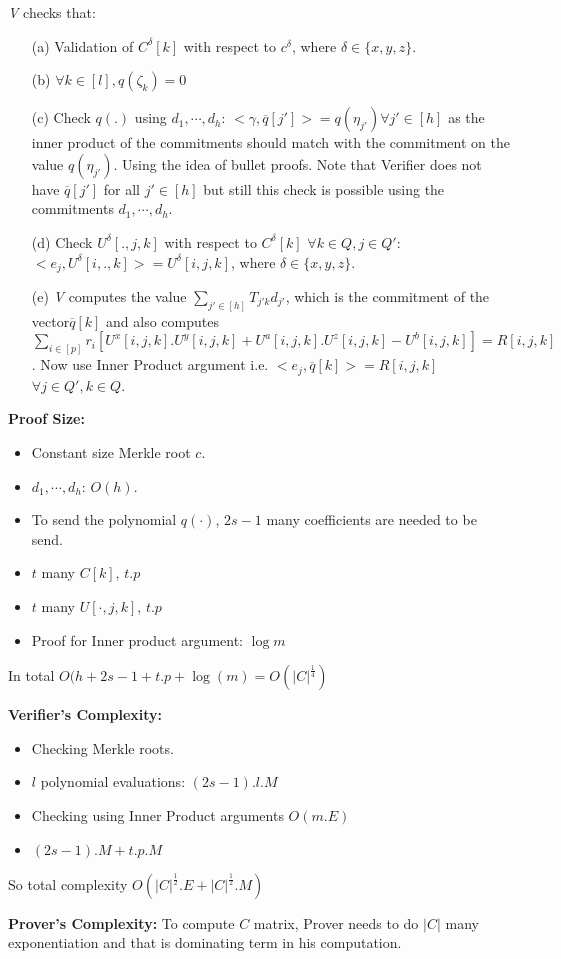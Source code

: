 \documentclass{article}
\begin{document}
\textit{V} checks that:
\begin{itemize}
	\item[(a)] Validation of $C^{\delta}[k]$ with respect to $c^{\delta}$, where $\delta\in\{x,y,z\}$. 
	\item[(b)] $\forall k\in[l], q(\zeta_k)=0$
	\item[(c)] Check $q(.)$ using $d_1,\cdots,d_h$: $<\gamma,\overline{q}[j']>=q(\eta_{j'})\forall j'\in[h]$ as the inner product of the commitments should match with the commitment on the value $q(\eta_{j'})$. Using the idea of bullet proofs. Note that Verifier does not have $\overline{q}[j'] $ for all $j'\in[h]$ but still this check is possible using the commitments $d_1,\cdots, d_h$.
	\item[(d)] Check $U^{\delta}[.,j,k]$ with respect to $C^{\delta}[k]$ $\forall k\in Q,  j\in Q'$: $<e_j,U^{\delta}[i,.,k]>=U^{\delta}[i,j,k]$, where $\delta\in\{x,y,z\}$. 
	\item[(e)] \textit{V} computes the value $\sum\limits_{j'\in[h]}T_{j'k}d_{j'}$, which is the commitment of the vector$\overline{q}[k]$ and also computes$\sum\limits_{i\in[p]} r_i[U^{x}[i,j,k].U^y[i,j,k]+U^{a}[i,j,k].U^z[i,j,k]-U^{b}[i,j,k]] =R[i,j,k]$. Now use Inner Product argument i.e. $<e_j,\overline{q}[k]>=R[i,j,k]$ $\forall j\in Q', k\in Q$.\\
\end{itemize}

\textbf{Proof Size:}
\begin{itemize}
	\item Constant size Merkle root $c$.
	\item $d_1,\cdots, d_h$: $O(h)$.
	\item To send the polynomial $q(\cdot)$, $2s-1$ many coefficients are needed to be send.
	\item $t$ many $C[k]$, $t.p$
	\item $t$ many $U[\cdot,j,k]$, $t.p$
	\item Proof for Inner product argument: $\log m$
\end{itemize}
In total $O(h+2s-1+t.p+\log(m) = O(|C|^{\frac{1}{4}})$

\textbf{Verifier's Complexity:}
\begin{itemize}
	\item Checking Merkle roots.
	\item $l$ polynomial evaluations: $(2s-1).l.M$
	\item Checking using Inner Product arguments $O(m.E)$
	\item $(2s-1).M+t.p.M$
\end{itemize}
So total complexity $O(|C|^{\frac{1}{2}}. E + |C|^{\frac{1}{2}}. M)$

\textbf{Prover's Complexity:}
 To compute $C$ matrix, Prover needs to do $|C|$ many exponentiation and that is dominating term in his computation.

	
\end{document}
